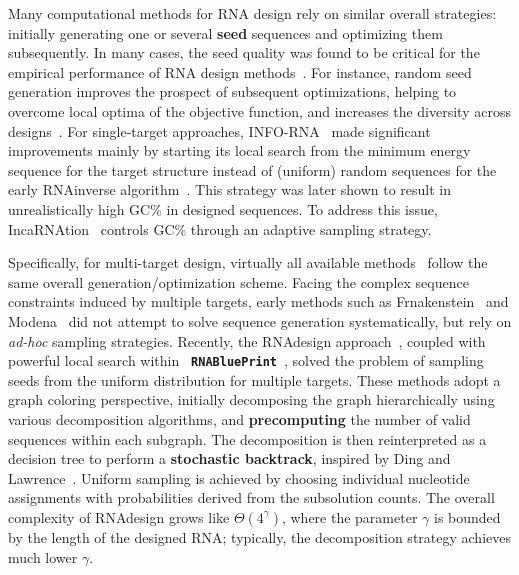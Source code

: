 \documentclass{bioinfo}
\newcommand{\Def}[1]{{\bfseries #1}}
\newcommand{\parHead}[1]{\Final{\paragraph{#1}}}
\newcommand{\Final}[1]{\begingroup\color{red!70!black}#1\endgroup}
\renewcommand{\Final}[1]{}
\newcommand{\Nuc}[1]{{\sf #1}}
\newcommand{\Cb}{\Nuc{C}}
\newcommand{\Gb}{\Nuc{G}}
\newcommand{\GCb}{\Gb\Cb}
\newcommand{\Software}[1]{{\ttfamily #1}}
\newcommand{\RNAblueprint}{{\tt \bfseries{}\color{black!75} RNA\textcolor{blue!70!black}{Blue}Print}}
\begin{document}
\parHead{On the importance of sampling for design.}
Many computational methods for RNA design rely on similar overall
strategies: initially generating one or several \Def{seed} sequences
and optimizing them subsequently. In many cases, the seed quality was
found to be critical for the empirical performance of RNA design
methods~\citep{Levin2012}. For instance, random seed generation
improves the prospect of subsequent optimizations, helping to overcome
local optima of the objective function, and increases the diversity
across designs~\citep{Reinharz2013}.  For single-target approaches,
\Software{INFO-RNA}~\citep{Busch2006} made significant improvements
mainly by starting its local search from the minimum energy sequence
for the target structure instead of (uniform) random sequences for the
early \Software{RNAinverse} algorithm~\citep{Hofacker1994}. This
strategy was later shown to result in unrealistically high
\GCb\% in designed sequences. To address this issue,
\Software{IncaRNAtion}~\citep{Reinharz2013} controls \GCb\%
through an adaptive sampling strategy.

\parHead{Specificities and similarities of multi-target design.}
Specifically, for multi-target design, virtually all available methods~\citep{Lyngsoe2012,HoenerzuSiederdissen2013,Taneda2015,Hammer2017} follow the same overall generation/optimization scheme.
%
Facing the complex sequence constraints induced by multiple targets, early methods such as \Software{Frnakenstein}~\citep{Lyngsoe2012} and \Software{Modena}~\citep{Taneda2015} did not attempt to solve sequence generation systematically, but rely on \emph{ad-hoc} sampling strategies.
%
Recently, the \Software{RNAdesign}
approach~\citep{HoenerzuSiederdissen2013}, coupled with powerful local
search within \RNAblueprint{}~\citep{Hammer2017}, solved the
problem of sampling seeds from the uniform distribution for multiple
targets. These methods adopt a graph coloring perspective, initially
decomposing the graph hierarchically using various decomposition
algorithms, and \Def{precomputing} the number of valid sequences
within each subgraph. The decomposition is then reinterpreted as a
decision tree to perform a \Def{stochastic backtrack}, inspired by
Ding and Lawrence~\citep{Ding2003}. Uniform sampling is achieved by
choosing individual nucleotide assignments with probabilities derived
from the subsolution counts. The overall complexity of
\Software{RNAdesign} grows like $\Theta(4^{\gamma})$, where the
parameter $\gamma$ is bounded by the length of the designed RNA;
typically, the decomposition strategy achieves much lower $\gamma$.
\end{document}

